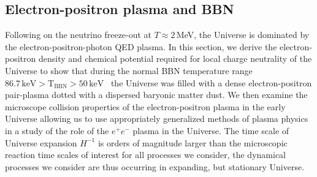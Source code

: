 \subsection{Electron-positron plasma and BBN}
\label{section_electron}
Following on the neutrino freeze-out at $T\approx 2$\,MeV, the Universe is dominated by the electron-positron-photon QED plasma. In this section, we derive the electron-positron density and chemical potential required for local charge neutrality of the Universe to show that during the normal BBN temperature range $86.7\,\mathrm{keV}>\mathrm{T_{BBN}}>50\,\mathrm{keV}$~\cite{Pitrou:2018cgg} the Universe was filled with a dense electron-positron pair-plasma dotted with a dispersed baryonic matter dust. We then examine the microscope collision properties of the electron-positron plasma in the early Universe allowing us to use  appropriately generalized methods of plasma physics in a study of the role of the $e^+e^-$ plasma in the Universe. The time scale of Universe expansion $H^{-1}$ is orders of magnitude larger than the microscopic reaction time scales of interest for all processes we consider, the dynamical processes we consider are  thus occurring in expanding, but stationary Universe.

  


